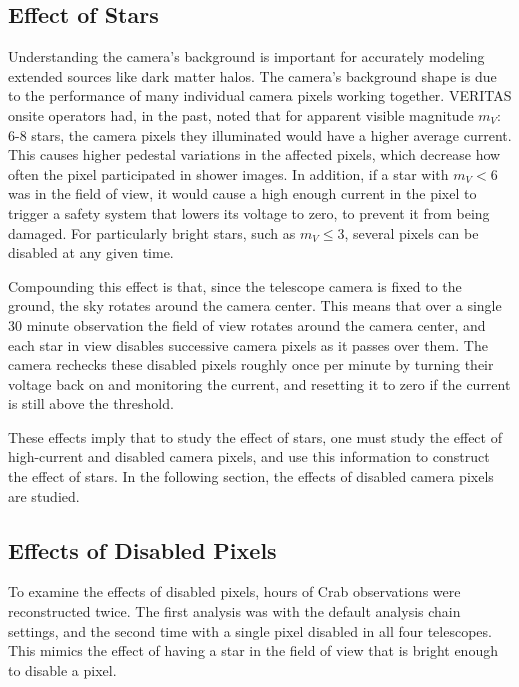   \subsection{Effect of Stars}
    Understanding the camera's background is important for accurately modeling extended sources like dark matter halos.
    The camera's background shape is due to the performance of many individual camera pixels working together.
    VERITAS onsite operators had, in the past, noted that for apparent visible magnitude $m_V :$ 6-8 stars, the camera pixels they illuminated would have a higher average current.
    This causes higher pedestal variations in the affected pixels, which decrease how often the pixel participated in shower images.
    In addition, if a star with $m_V < 6$ was in the field of view, it would cause a high enough current in the pixel to trigger a safety system that lowers its voltage to zero, to prevent it from being damaged.
    For particularly bright stars, such as $m_V \leq 3$, several pixels can be disabled at any given time.

    Compounding this effect is that, since the telescope camera is fixed to the ground, the sky rotates around the camera center.
    This means that over a single 30 minute observation the field of view rotates around the camera center, and each star in view disables successive camera pixels as it passes over them.
    The camera rechecks these disabled pixels roughly once per minute by turning their voltage back on and monitoring the current, and resetting it to zero if the current is still above the threshold.

    These effects imply that to study the effect of stars, one must study the effect of high-current and disabled camera pixels, and use this information to construct the effect of stars.
    In the following section, the effects of disabled camera pixels are studied.
    
  \subsection{Effects of Disabled Pixels}

    To examine the effects of disabled pixels,  hours of Crab observations were reconstructed twice.
    The first analysis was with the default analysis chain settings, and the second time with a single pixel disabled in all four telescopes.
    This mimics the effect of having a star in the field of view that is bright enough to disable a pixel.

